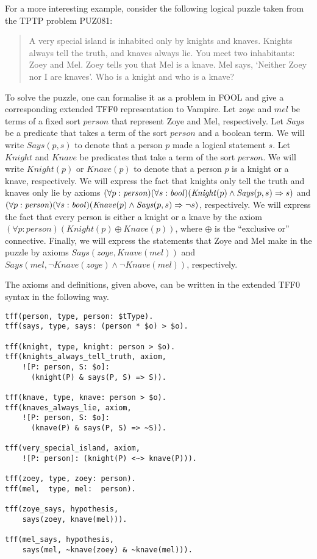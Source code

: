 For a more interesting example, consider the following logical puzzle taken from the TPTP problem \mbox{PUZ081}:
\begin{quote}
  A very special island is inhabited only by knights and knaves. Knights always tell the truth, and knaves always lie. You meet two inhabitants: Zoey and Mel. Zoey tells you that Mel is a knave. Mel says, `Neither Zoey nor I are knaves'. Who is a knight and who is a knave?
\end{quote}

\newcommand{\knight}{\mathit{Knight}}
\newcommand{\knave}{\mathit{Knave}}
\newcommand{\says}{\mathit{Says}}
\newcommand{\statement}{\mathit{statement}}
\newcommand{\person}{\mathit{person}}
\newcommand{\zoye}{\mathit{zoye}}
\newcommand{\mel}{\mathit{mel}}
To solve the puzzle, one can formalise it as a problem in FOOL and give a corresponding extended TFF0 representation to Vampire. Let $\zoye$ and $\mel$ be terms of a fixed sort $\person$ that represent Zoye and Mel, respectively. Let $\says$ be a predicate that takes a term of the sort $\person$ and a boolean term. We will write $\says(p, s)$ to denote that a person $p$ made a logical statement $s$. Let $\knight$ and $\knave$ be predicates that take a term of the sort $\person$. We will write $\knight(p)$ or $\knave(p)$ to denote that a person $p$ is a knight or a knave, respectively. We will express the fact that knights only tell the truth and knaves only lie by axioms $(\forall p:\person)(\forall s:\bool)(\knight(p) \land \says(p, s) \implies s)$ and $(\forall p:\person)(\forall s:\bool)(\knave(p) \land \says(p, s) \implies \neg s)$, respectively. We will express the fact that every person is either a knight or a knave by the axiom $(\forall p:\person)(\knight(p) \oplus \knave(p))$, where $\oplus$ is the ``exclusive or'' connective. Finally, we will express the statements that Zoye and Mel make in the puzzle by axioms $\says(\zoye, \knave(\mel))$ and $\says(\mel, \neg\knave(\zoye) \land \neg\knave(\mel))$, respectively.

The axioms and definitions, given above, can be written in the extended TFF0 syntax in the following way.
\begin{lstlisting}[language=tptp]
tff(person, type, person: $tType).
tff(says, type, says: (person * $o) > $o).

tff(knight, type, knight: person > $o).
tff(knights_always_tell_truth, axiom,
    ![P: person, S: $o]:
      (knight(P) & says(P, S) => S)).

tff(knave, type, knave: person > $o).
tff(knaves_always_lie, axiom,
    ![P: person, S: $o]:
      (knave(P) & says(P, S) => ~S)).

tff(very_special_island, axiom,
    ![P: person]: (knight(P) <~> knave(P))).

tff(zoey, type, zoey: person).
tff(mel,  type, mel:  person).

tff(zoye_says, hypothesis,
    says(zoey, knave(mel))).

tff(mel_says, hypothesis,
    says(mel, ~knave(zoey) & ~knave(mel))).
\end{lstlisting}%

